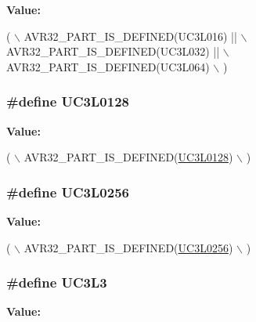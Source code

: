 {\bfseries Value\-:}
\begin{DoxyCode}
(   \(\backslash\)
        AVR32\_PART\_IS\_DEFINED(UC3L016) || \(\backslash\)
        AVR32\_PART\_IS\_DEFINED(UC3L032) || \(\backslash\)
        AVR32\_PART\_IS\_DEFINED(UC3L064) \(\backslash\)
        )
\end{DoxyCode}
\hypertarget{group__uc3__part__macros__group_ga2acf2e6f59e322e343123ad12fe89c2c}{
\subsubsection[{U\-C3\-L0128}]{\setlength{\rightskip}{0pt plus 5cm}\#define U\-C3\-L0128}}\label{group__uc3__part__macros__group_ga2acf2e6f59e322e343123ad12fe89c2c}
{\bfseries Value\-:}
\begin{DoxyCode}
( \(\backslash\)
        AVR32\_PART\_IS\_DEFINED(\hyperlink{group__uc3__part__macros__group_ga2acf2e6f59e322e343123ad12fe89c2c}{UC3L0128}) \(\backslash\)
        )
\end{DoxyCode}
\hypertarget{group__uc3__part__macros__group_gaa8ab88d4e48e7936416c4475b42e5b49}{
\subsubsection[{U\-C3\-L0256}]{\setlength{\rightskip}{0pt plus 5cm}\#define U\-C3\-L0256}}\label{group__uc3__part__macros__group_gaa8ab88d4e48e7936416c4475b42e5b49}
{\bfseries Value\-:}
\begin{DoxyCode}
( \(\backslash\)
        AVR32\_PART\_IS\_DEFINED(\hyperlink{group__uc3__part__macros__group_gaa8ab88d4e48e7936416c4475b42e5b49}{UC3L0256}) \(\backslash\)
        )
\end{DoxyCode}
\hypertarget{group__uc3__part__macros__group_gade3b8d2d26305ef47bb7b52212807e1d}{
\subsubsection[{U\-C3\-L3}]{\setlength{\rightskip}{0pt plus 5cm}\#define U\-C3\-L3}}\label{group__uc3__part__macros__group_gade3b8d2d26305ef47bb7b52212807e1d}
{\bfseries Value\-:}
